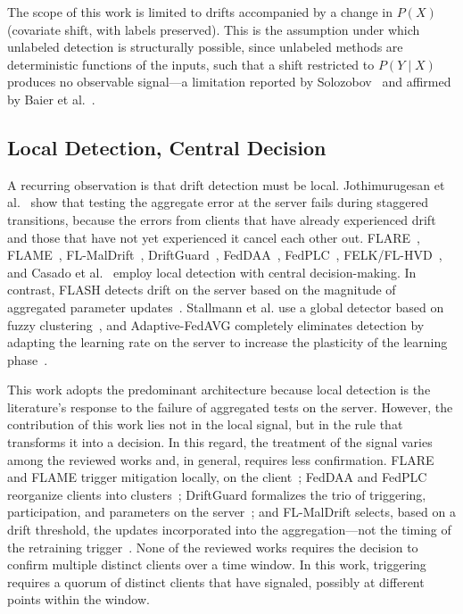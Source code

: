 \documentclass[conference]{IEEEtran}
\begin{document}
The scope of this work is limited to drifts accompanied by a change in $P(X)$ (covariate shift, with labels preserved). This is the assumption under which unlabeled detection is structurally possible, since unlabeled methods are deterministic functions of the inputs, such that a shift restricted to $P(Y\mid X)$ produces no observable signal—a limitation reported by Solozobov~\cite{solozobov2026} and affirmed by Baier et al.~\cite{baier2023}.

\subsection{Local Detection, Central Decision}

A recurring observation is that drift detection must be local. Jothimurugesan et al.~\cite{jothimurugesan2023} show that testing the aggregate error at the server fails during staggered transitions, because the errors from clients that have already experienced drift and those that have not yet experienced it cancel each other out. FLARE~\cite{chow2023}, FLAME~\cite{mavromatis2024}, FL-MalDrift~\cite{patel2026}, DriftGuard~\cite{han2026}, FedDAA~\cite{fu2025}, FedPLC~\cite{zhou2026}, FELK/FL-HVD~\cite{chen2026}, and Casado et al.~\cite{casado2022} employ local detection with central decision-making. In contrast, FLASH detects drift on the server based on the magnitude of aggregated parameter updates~\cite{panchal2023}. Stallmann et al. use a global detector based on fuzzy clustering~\cite{stallmann2024}, and Adaptive-FedAVG completely eliminates detection by adapting the learning rate on the server to increase the plasticity of the learning phase~\cite{canonaco2021}.

This work adopts the predominant architecture because local detection is the literature’s response to the failure of aggregated tests on the server. However, the contribution of this work lies not in the local signal, but in the rule that transforms it into a decision. In this regard, the treatment of the signal varies among the reviewed works and, in general, requires less confirmation. FLARE and FLAME trigger mitigation locally, on the client~\cite{chow2023,mavromatis2024}; FedDAA and FedPLC reorganize clients into clusters~\cite{fu2025,zhou2026}; DriftGuard formalizes the trio of triggering, participation, and parameters on the server~\cite{han2026}; and FL-MalDrift selects, based on a drift threshold, the updates incorporated into the aggregation—not the timing of the retraining trigger~\cite{patel2026}. None of the reviewed works requires the decision to confirm multiple distinct clients over a time window. In this work, triggering requires a quorum of distinct clients that have signaled, possibly at different points within the window.
\end{document}
